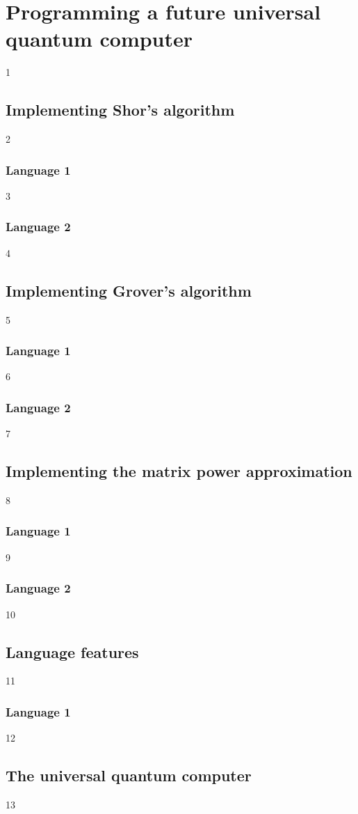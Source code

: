 \section{Programming a future universal quantum computer}
1
\subsection{Implementing Shor's algorithm}
2
\subsubsection{Language 1}
3
\subsubsection{Language 2}
4
\subsection{Implementing Grover's algorithm}
5
\subsubsection{Language 1}
6
\subsubsection{Language 2}
7
\subsection{Implementing the matrix power approximation}
8
\subsubsection{Language 1}
9
\subsubsection{Language 2}
10
\subsection{Language features}
11
\subsubsection{Language 1}
12
\subsection{The universal quantum computer}
13

